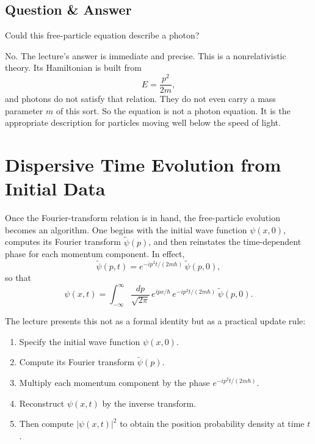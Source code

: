 \subsection{Question \& Answer}

Could this free-particle equation describe a photon?

No. The lecture's answer is immediate and precise. This is a nonrelativistic theory. Its Hamiltonian is built from
\begin{equation}
E=\frac{p^2}{2m},
\end{equation}
and photons do not satisfy that relation. They do not even carry a mass parameter \(m\) of this sort. So the equation is not a photon equation. It is the appropriate description for particles moving well below the speed of light.

\section{Dispersive Time Evolution from Initial Data}

Once the Fourier-transform relation is in hand, the free-particle evolution becomes an algorithm. One begins with the initial wave function \(\psi(x,0)\), computes its Fourier transform \(\tilde\psi(p)\), and then reinstates the time-dependent phase for each momentum component. In effect,
\begin{equation}
\tilde\psi(p,t)
=
e^{-i p^2 t/(2m\hbar)}\,\tilde\psi(p,0),
\end{equation}
so that
\begin{equation}
\psi(x,t)
=
\int_{-\infty}^{\infty}
\frac{dp}{\sqrt{2\pi}}\,
e^{i p x/\hbar}\,
e^{-i p^2 t/(2m\hbar)}\,
\tilde\psi(p,0).
\end{equation}

The lecture presents this not as a formal identity but as a practical update rule:
\begin{enumerate}
\item Specify the initial wave function \(\psi(x,0)\).
\item Compute its Fourier transform \(\tilde\psi(p)\).
\item Multiply each momentum component by the phase \(e^{-i p^2 t/(2m\hbar)}\).
\item Reconstruct \(\psi(x,t)\) by the inverse transform.
\item Then compute \(|\psi(x,t)|^2\) to obtain the position probability density at time \(t\).
\end{enumerate}

